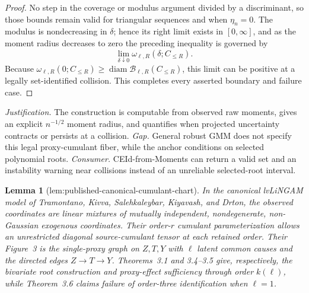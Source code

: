 \documentclass{article}
\newtheorem{lemma}{Lemma}
\begin{document}
\begin{proof}
No step in the coverage or modulus argument divided by a discriminant, so those bounds remain valid for triangular sequences and when \(\eta_n=0\).  The modulus is nondecreasing in \(\delta\); hence its right limit exists in \([0,\infty]\), and as the moment radius decreases to zero the preceding inequality is governed by
\[
 \lim_{\delta\downarrow0}\omega_{\ell,R}(\delta;C_{\le R}).
\]
Because \(\omega_{\ell,R}(0;C_{\le R})\ge
\operatorname{diam}\mathcal B_{\ell,R}(C_{\le R})\), this limit can be positive at a legally set-identified collision.  This completes every asserted boundary and failure case.
\end{proof}
\par\smallskip\noindent \textit{Justification.} The construction is computable from observed raw moments, gives an explicit \(n^{-1/2}\) moment radius, and quantifies when projected uncertainty contracts or persists at a collision. \textit{Gap.} General robust GMM does not specify this legal proxy-cumulant fiber, while the anchor conditions on selected polynomial roots. \textit{Consumer.} CEId-from-Moments can return a valid set and an instability warning near collisions instead of an unreliable selected-root interval.

\begin{lemma}[lem:published-canonical-cumulant-chart]\label{lem:published-canonical-cumulant-chart}
In the canonical lvLiNGAM model of Tramontano, Kivva, Salehkaleybar, Kiyavash, and Drton, the observed coordinates are linear mixtures of mutually independent, nondegenerate, non-Gaussian exogenous coordinates.  Their order-\(r\) cumulant parameterization allows an unrestricted diagonal source-cumulant tensor at each retained order.  Their Figure~3 is the single-proxy graph on \(Z,T,Y\) with \(\ell\) latent common causes and the directed edges \(Z\to T\to Y\).  Theorems~3.1 and 3.4--3.5 give, respectively, the bivariate root construction and proxy-effect sufficiency through order \(k(\ell)\), while Theorem~3.6 claims failure of order-three identification when \(\ell=1\).
\end{lemma}
\end{document}

